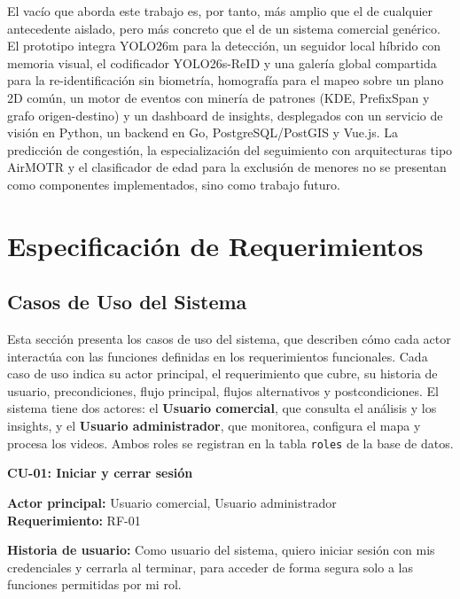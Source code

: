 \documentclass[12pt,letterpaper]{article}
\begin{document}
El vacío que aborda este trabajo es, por tanto, más amplio que el de
cualquier antecedente aislado, pero más concreto que el de un sistema
comercial genérico. El prototipo integra YOLO26m para la detección, un
seguidor local híbrido con memoria visual, el codificador YOLO26s-ReID y
una galería global compartida para la re-identificación sin biometría,
homografía para el mapeo sobre un plano 2D común, un motor de eventos con
minería de patrones (KDE, PrefixSpan y grafo origen-destino) y un
dashboard de insights, desplegados con un servicio de visión en Python,
un backend en Go, PostgreSQL/PostGIS y Vue.js. La predicción de
congestión, la especialización del seguimiento con arquitecturas tipo
AirMOTR y el clasificador de edad para la exclusión de menores no se
presentan como componentes implementados, sino como trabajo futuro.


\section{Especificación de Requerimientos}

\subsection{Casos de Uso del Sistema}

Esta sección presenta los casos de uso del sistema, que describen cómo cada
actor interactúa con las funciones definidas en los requerimientos
funcionales. Cada caso de uso indica su actor principal, el requerimiento
que cubre, su historia de usuario, precondiciones, flujo principal, flujos
alternativos y postcondiciones. El sistema tiene dos actores: el
\textbf{Usuario comercial}, que consulta el análisis y los insights, y el
\textbf{Usuario administrador}, que monitorea, configura el mapa y procesa
los videos. Ambos roles se registran en la tabla \texttt{roles} de la base
de datos.

\textbf{CU-01: Iniciar y cerrar sesión}

\textbf{Actor principal:} Usuario comercial, Usuario administrador \\
\textbf{Requerimiento:} RF-01

\textbf{Historia de usuario:} Como usuario del sistema, quiero iniciar sesión con mis credenciales y cerrarla al terminar, para acceder de forma segura solo a las funciones permitidas por mi rol.
\end{document}

